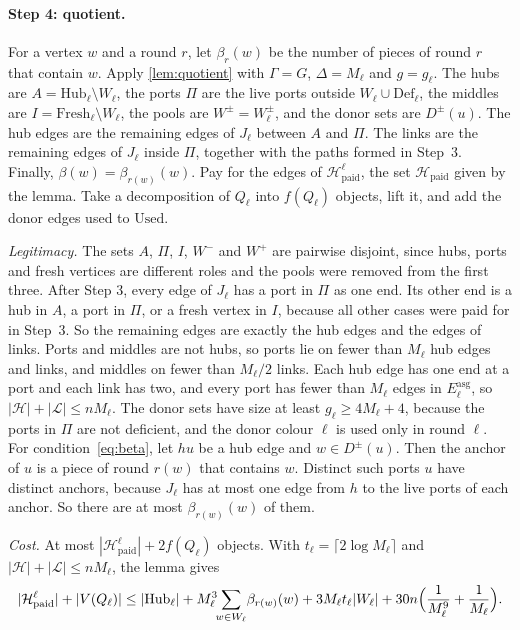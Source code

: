\documentclass[11pt]{article}
\theoremstyle{definition}
\theoremstyle{remark}
\numberwithin{equation}{section}
\numberwithin{figure}{section}
\numberwithin{table}{section}
\newcommand{\cH}{\mathcal{H}}
\newcommand{\cL}{\mathcal{L}}
\newcommand{\Hub}{\mathrm{Hub}}
\newcommand{\Fresh}{\mathrm{Fresh}}
\newcommand{\Def}{\mathrm{Def}}
\newcommand{\Used}{\mathrm{Used}}
\newcommand{\Eas}{E^{\mathrm{asg}}}
\newcommand{\paid}{\mathrm{paid}}
\begin{document}
\paragraph{Step 4: quotient.} For a vertex $w$ and a round $r$, let
$\beta_r(w)$ be the number of pieces of round $r$ that contain $w$. Apply
\cref{lem:quotient} with $\Gamma=G$, $\Delta=M_\ell$ and $g=g_\ell$. The hubs are
$A=\Hub_\ell\setminus W_\ell$, the ports $\Pi$ are the live ports outside
$W_\ell\cup\Def_\ell$, the middles are $I=\Fresh_\ell\setminus W_\ell$, the
pools are $W^\pm=W_\ell^\pm$, and the donor sets are $D^\pm(u)$. The hub edges
are the remaining edges of $J_\ell$ between $A$ and $\Pi$. The links are the
remaining edges of $J_\ell$ inside $\Pi$, together with the paths formed in
Step~3. Finally, $\beta(w)=\beta_{r(w)}(w)$. Pay for the edges of
$\cH^\ell_\paid$, the set $\cH_\paid$ given by the lemma. Take a decomposition
of $Q_\ell$ into $f(Q_\ell)$ objects, lift it, and add the donor edges used to
$\Used$.

\emph{Legitimacy.} The sets $A$, $\Pi$, $I$, $W^-$ and $W^+$ are pairwise
disjoint, since hubs, ports and fresh vertices are different roles and the pools
were removed from the first three. After Step 3, every edge of $J_\ell$ has a
port in $\Pi$ as one end. Its other end is a hub in $A$, a port in $\Pi$, or a
fresh vertex in $I$, because all other cases were paid for in Step~3. So the
remaining edges are exactly the hub edges and the edges of links. Ports and
middles are not hubs, so ports lie on fewer than $M_\ell$ hub edges and links,
and middles on fewer than $M_\ell/2$ links. Each hub edge has one end at a port
and each link has two, and every port has fewer than $M_\ell$ edges in
$\Eas_\ell$, so $|\cH|+|\cL|\le nM_\ell$. The donor sets have size at least $g_\ell\ge4M_\ell+4$, because the
ports in $\Pi$ are not deficient, and the donor colour $\ell$ is used only in
round $\ell$. For condition~\eqref{eq:beta}, let $hu$ be a hub edge and
$w\in D^\pm(u)$. Then the anchor of $u$ is a piece of round $r(w)$ that contains
$w$. Distinct such ports $u$ have distinct anchors, because $J_\ell$ has at
most one edge from $h$ to the live ports of each anchor. So there are at most
$\beta_{r(w)}(w)$ of them.

\emph{Cost.} At most $|\cH^\ell_\paid|+2f(Q_\ell)$ objects. With
$t_\ell=\lceil2\log M_\ell\rceil$ and $|\cH|+|\cL|\le nM_\ell$, the lemma gives
\begin{equation}\label{eq:Qsize}
|\cH^\ell_\paid|+|V(Q_\ell)|\le|\Hub_\ell|+M_\ell^3\!\!\sum_{w\in W_\ell}\!\beta_{r(w)}(w)
+3M_\ell t_\ell|W_\ell|+30n\Bigl(\frac1{M_\ell^9}+\frac1{M_\ell}\Bigr).
\end{equation}
\end{document}
